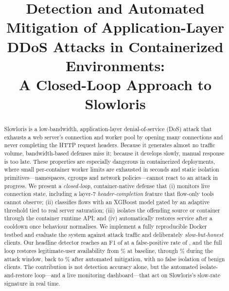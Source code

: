 \documentclass[conference]{IEEEtran}
\begin{document}
\title{Detection and Automated Mitigation of Application-Layer\\
DDoS Attacks in Containerized Environments:\\
A Closed-Loop Approach to Slowloris}

\author{
}

\maketitle

\begin{abstract}
Slowloris is a low-bandwidth, application-layer denial-of-service (DoS) attack
that exhausts a web server's connection and worker pool by opening many
connections and never completing the HTTP request headers. Because it generates
almost no traffic volume, bandwidth-based defenses miss it; because it develops
slowly, manual response is too late. These properties are especially dangerous
in containerized deployments, where small per-container worker limits are
exhausted in seconds and static isolation primitives---namespaces, cgroups and
network policies---cannot react to an attack in progress. We present a
\emph{closed-loop}, container-native defense that (i) monitors live connection
state, including a layer-7 \emph{header-completion} feature that flow-only tools
cannot observe; (ii) classifies flows with an XGBoost model gated by an adaptive
threshold tied to real server saturation; (iii) isolates the offending source
or container through the container runtime API; and (iv) automatically restores
service after a cooldown once behaviour normalises. We implement a fully
reproducible Docker testbed and evaluate the system against attack traffic and
deliberately \emph{slow-but-honest} clients. Our headline detector reaches an F1
of \RESxgbFone{} at a false-positive rate of \RESxgbFpr{}, and the full loop
restores legitimate-user availability from \RESavailBase\%{} at baseline, through
\RESavailAttack\%{} during the attack window, back to \RESavailRecovered\%{}
after automated mitigation, with no false isolation of benign clients. The
contribution is not detection accuracy alone, but the automated
isolate-and-restore loop---and a live monitoring dashboard---that act on
Slowloris's slow-rate signature in real time.
\end{abstract}
\end{document}
